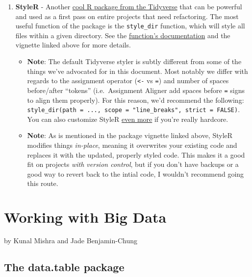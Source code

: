\documentclass[]{book}
\providecommand{\tightlist}{%
  \setlength{\itemsep}{0pt}\setlength{\parskip}{0pt}}
\begin{document}
\begin{enumerate}
\def\labelenumi{\arabic{enumi}.}
\setcounter{enumi}{2}
\tightlist
\item
  \textbf{StyleR} - Another \href{https://www.tidyverse.org/articles/2017/12/styler-1.0.0/}{cool R package from the Tidyverse} that can be powerful and used as a first pass on entire projects that need refactoring. The most useful function of the package is the \texttt{style\_dir} function, which will style all files within a given directory. See the \href{https://www.rdocumentation.org/packages/styler/versions/1.1.0/topics/style_dir}{function's documentation} and the vignette linked above for more details.

  \begin{itemize}
  \tightlist
  \item
    \textbf{Note}: The default Tidyverse styler is subtly different from some of the things we've advocated for in this document. Most notably we differ with regards to the assignment operator (\texttt{\textless{}-} vs \texttt{=}) and number of spaces before/after ``tokens'' (i.e.~Assignment Aligner add spaces before \texttt{=} signs to align them properly). For this reason, we'd recommend the following: \texttt{style\_dir(path\ =\ ...,\ scope\ =\ "line\_breaks",\ strict\ =\ FALSE)}. You can also customize StyleR \href{http://styler.r-lib.org/articles/customizing_styler.html}{even more} if you're really hardcore.
  \item
    \textbf{Note}: As is mentioned in the package vignette linked above, StyleR modifies things \emph{in-place}, meaning it overwrites your existing code and replaces it with the updated, properly styled code. This makes it a good fit on projects \emph{with version control}, but if you don't have backups or a good way to revert back to the intial code, I wouldn't recommend going this route.
  \end{itemize}
\end{enumerate}

\hypertarget{working-with-big-data}{%
\chapter{Working with Big Data}\label{working-with-big-data}}

by Kunal Mishra and Jade Benjamin-Chung

\hypertarget{the-data.table-package}{%
\section{The data.table package}\label{the-data.table-package}}
\end{document}
